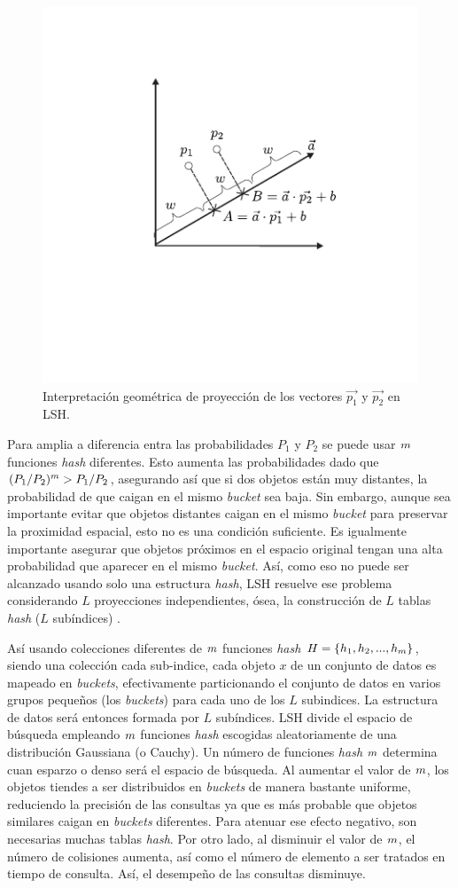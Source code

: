 \begin{figure}[htp]\centering
\includegraphics[width=0.35\columnwidth]{chapter2/lsh_projection.pdf}
\caption{Interpretación geométrica de proyección de los  vectores $\vec{p_1}$ y $\vec{p_2}$ en LSH.}
\label{fig:quantization}
\end{figure}

Para amplia a diferencia entra las probabilidades $P_1$ y $P_2$ se puede usar $m$ funciones \textit{hash} diferentes. Esto aumenta las probabilidades dado que \mbox{$(P_1/P_2)^m > P_1/P_2$}, asegurando así que si dos objetos están muy distantes, la probabilidad de que caigan en el mismo \textit{bucket} sea baja. Sin embargo, aunque sea importante evitar que objetos distantes caigan en el mismo \textit{bucket} para preservar la proximidad espacial, esto no es una condición suficiente. Es igualmente importante asegurar que objetos próximos en el espacio original tengan una alta probabilidad que aparecer en el mismo \textit{bucket}. Así, como eso no puede ser alcanzado usando solo una estructura \textit{hash}, LSH resuelve ese problema considerando $L$ proyecciones independientes, ósea, la construcción de $L$ tablas \textit{hash} ($L$ subíndices) \cite{lshtutorial,taoLSBLSH}.

Así usando colecciones diferentes de $m$ funciones \textit{hash} $H = \{h_1, h_2, ..., h_m\}$, siendo una colección cada sub-indice, cada objeto $x$ de un conjunto de datos es mapeado en \textit{buckets}, efectivamente particionando el conjunto de datos en varios grupos pequeños (los \textit{buckets}) para cada uno de los $L$ subindices. La estructura de datos será entonces formada por $L$ subíndices. LSH divide el espacio de búsqueda empleando $m$ funciones \textit{hash} escogidas aleatoriamente de una distribución Gaussiana (o Cauchy). Un número de funciones \textit{hash} $m$ determina cuan esparzo o denso será el espacio de búsqueda. Al aumentar el valor de $m$, los objetos tiendes a ser distribuidos en \textit{buckets} de manera bastante uniforme, reduciendo la precisión de las consultas ya que es más probable que objetos similares caigan en \textit{buckets} diferentes. Para atenuar ese efecto negativo, son necesarias muchas tablas \textit{hash}. Por otro lado, al disminuir el valor de $m$, el número de colisiones aumenta, así como el número de elemento a ser tratados en tiempo de consulta. Así, el desempeño de las consultas disminuye.


